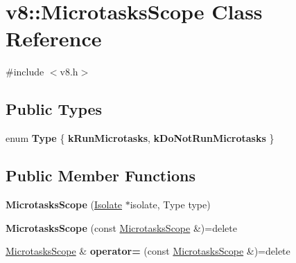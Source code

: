 \hypertarget{classv8_1_1MicrotasksScope}{}\section{v8\+:\+:Microtasks\+Scope Class Reference}
\label{classv8_1_1MicrotasksScope}


{\ttfamily \#include $<$v8.\+h$>$}

\subsection*{Public Types}
\begin{DoxyCompactItemize}
\item 
\mbox{\label{classv8_1_1MicrotasksScope_a826cf210978221741a0467cd9be6996f}} 
enum {\bfseries Type} \{ {\bfseries k\+Run\+Microtasks}, 
{\bfseries k\+Do\+Not\+Run\+Microtasks}
 \}
\end{DoxyCompactItemize}
\subsection*{Public Member Functions}
\begin{DoxyCompactItemize}
\item 
\mbox{\label{classv8_1_1MicrotasksScope_a40348ac94c7e9ea405c2546d94d9d927}} 
{\bfseries Microtasks\+Scope} (\mbox{\hyperlink{classv8_1_1Isolate}{Isolate}} $\ast$isolate, Type type)
\item 
\mbox{\label{classv8_1_1MicrotasksScope_a7944315d9e337a0608cccdd2483ae873}} 
{\bfseries Microtasks\+Scope} (const \mbox{\hyperlink{classv8_1_1MicrotasksScope}{Microtasks\+Scope}} \&)=delete
\item 
\mbox{\label{classv8_1_1MicrotasksScope_a371928b4483bfa87f26ee0652a4931ba}} 
\mbox{\hyperlink{classv8_1_1MicrotasksScope}{Microtasks\+Scope}} \& {\bfseries operator=} (const \mbox{\hyperlink{classv8_1_1MicrotasksScope}{Microtasks\+Scope}} \&)=delete
\end{DoxyCompactItemize}
